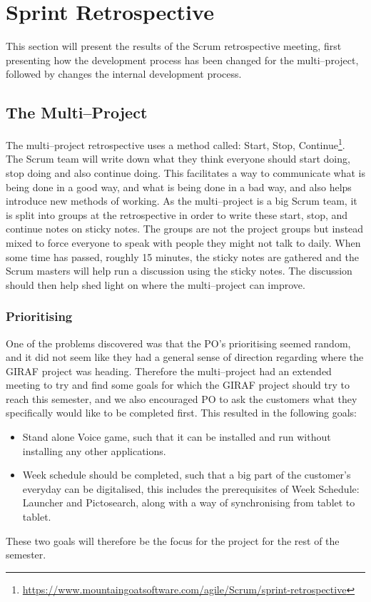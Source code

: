 \section{Sprint Retrospective}\label{s1retro}
This section will present the results of the Scrum retrospective meeting, first presenting how the development process has been changed for the multi--project, followed by changes the internal development process.

\subsection{The Multi--Project}\label{retro1}
The multi--project retrospective uses a method called: Start, Stop, Continue\footnote{\url{https://www.mountaingoatsoftware.com/agile/Scrum/sprint-retrospective}}.
The Scrum team will write down what they think everyone should start doing, stop doing and also continue doing.
This facilitates a way to communicate what is being done in a good way, and what is being done in a bad way, and also helps introduce new methods of working.
As the multi--project is a big Scrum team, it is split into groups at the retrospective in order to write these start, stop, and continue notes on sticky notes.
The groups are not the project groups but instead mixed to force everyone to speak with people they might not talk to daily.
When some time has passed, roughly 15 minutes, the sticky notes are gathered and the Scrum masters will help run a discussion using the sticky notes.
The discussion should then help shed light on where the multi--project can improve.

\subsubsection{Prioritising}
One of the problems discovered was that the PO's prioritising seemed random, and it did not seem like they had a general sense of direction regarding where the GIRAF project was heading.
Therefore the multi--project had an extended meeting to try and find some goals for which the GIRAF project should try to reach this semester, and we also encouraged PO to ask the customers what they specifically would like to be completed first.
This resulted in the following goals:
\begin{itemize}
	\item Stand alone Voice game, such that it can be installed and run without installing any other applications.
	\item Week schedule should be completed, such that a big part of the customer's everyday can be digitalised, this includes the prerequisites of Week Schedule: Launcher and Pictosearch, along with a way of synchronising from tablet to tablet.
\end{itemize}
These two goals will therefore be the focus for the project for the rest of the semester.


